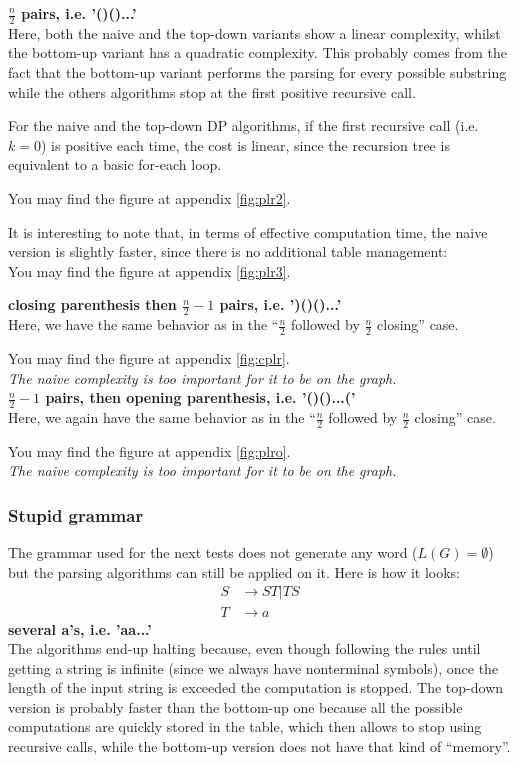\documentclass[twocolumn]{article}
\begin{document}
\textbf{$\frac n2$ pairs, i.e. '()()...'}\\
Here, both the naive and the top-down variants show a linear complexity, whilst the bottom-up variant has a quadratic complexity. This probably comes from the fact that the bottom-up variant performs the parsing for every possible substring while the others algorithms stop at the first positive recursive call.\par
For the naive and the top-down DP algorithms, if the first recursive call (i.e. $k=0$) is positive each time, the cost is linear, since the recursion tree is equivalent to a basic for-each loop.

You may find the figure at appendix \ref{fig:plr2}.

It is interesting to note that, in terms of effective computation time, the naive version is slightly faster, since there is no additional table management:\\
You may find the figure at appendix \ref{fig:plr3}.

\textbf{closing parenthesis then $\frac n2-1$ pairs, i.e. ')()()...'}\\
Here, we have the same behavior as in the ``$\frac n2$ followed by $\frac n2$
closing'' case. 

You may find the figure at appendix \ref{fig:cplr}.\\
\textit{The naive complexity is too important for it to be on the graph.}
\\

\textbf{$\frac n2-1$ pairs, then opening parenthesis, i.e. '()()...('}\\
Here, we again have the same behavior as in the ``$\frac n2$ followed by $\frac n2$
closing'' case.

You may find the figure at appendix \ref{fig:plro}.\\
\textit{The naive complexity is too important for it to be on the graph.}

\subsubsection{Stupid grammar}
The grammar used for the next tests does not generate any word ($L(G)=\emptyset$) but the parsing algorithms can still be applied on it. Here is how it looks:
\begin{align*}
  S&\rightarrow ST|TS\\
  T&\rightarrow a
\end{align*}
\textbf{several a's, i.e. 'aa...'}\\
The algorithms end-up halting because, even though following the rules until
getting a string is infinite (since we always have nonterminal symbols), once
the length of the input string is exceeded the computation is stopped. The top-down
version is probably faster than the bottom-up one because all the possible
computations are quickly stored in the table, which then allows to stop using
recursive calls, while the bottom-up version does not have that kind of ``memory''.
\end{document}
